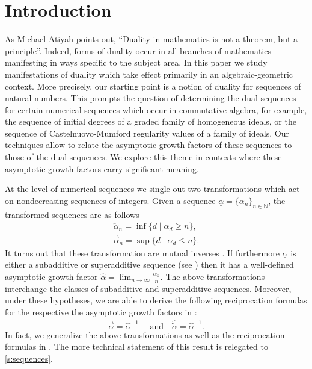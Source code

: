 \documentclass[12pt, reqno]{amsart}
\numberwithin{equation}{section}
\def\a{\ensuremath{\alpha}}
\def\ua{\ensuremath{\underline{\alpha}}}
\newcommand{\wa}{\widehat{\alpha}}
\newcommand{\N}{{\mathbb N}}
\theoremstyle{plain} %
\theoremstyle{definition}
\theoremstyle{remark}
\newcommand{\ao}{\overleftarrow{\alpha}}
\newcommand{\au}{\overrightarrow{\alpha}}
\begin{document}
\maketitle
\setcounter{tocdepth}{1}
\tableofcontents


\vspace{-0.5em}
\section{Introduction}

As Michael Atiyah \cite{Atiyah} points out,
``Duality in mathematics is not a theorem, but a principle''. Indeed, forms of duality occur in all branches of mathematics manifesting in ways specific to the subject area.
In this paper we study manifestations of duality which take effect primarily in an algebraic-geometric context. More precisely, our starting point is a notion of duality for sequences of natural numbers. This prompts the question of determining the dual sequences for certain numerical sequences which occur in commutative algebra, for example, the sequence of initial degrees of a graded family of homogeneous ideals, or the sequence of Castelnuovo-Mumford regularity values of a family of ideals. Our techniques allow to relate the asymptotic growth factors of these sequences to those of the dual sequences. We explore this theme in contexts where these asymptotic growth factors carry significant meaning.

At the level of numerical sequences we single out two transformations which act on nondecreasing sequences of integers. Given a sequence $\ua=\{\a_n\}_{n\in\N}$, the transformed sequences are as follows
 \begin{eqnarray*}
 \ao_n=\inf\{d\mid \alpha_d\geq n\},\\
\au_n=\sup\{d\mid \alpha_d\leq n\}.
\end{eqnarray*}
It turns out that these transformation are mutual inverses \cite{Johnson11}. If furthermore $\ua$ is either a subadditive or superadditive sequence (see ) then it has a well-defined asymptotic growth factor $\wa=\lim_{n\to \infty}\frac{\a_n}{n}$. The above transformations interchange the classes of subadditive and superadditive sequences. Moreover, under these hypotheses,  we are able to derive the following reciprocation formulas for the respective the asymptotic growth factors in :
\[
\widehat{\au} = \widehat{\a}^{-1} \quad \text{ and} \quad \widehat{\ao} = \widehat{\a}^{-1}.
\]
In fact, we %
generalize the above transformations as well as the reciprocation formulas in . The more technical statement of this result is relegated to \cref{s:sequences}.
\end{document}

